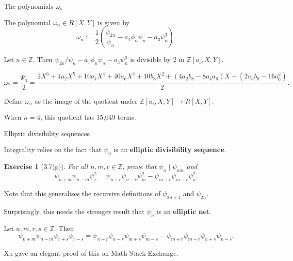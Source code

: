 \documentclass[10pt]{beamer}
\newtheorem{exercise}{Exercise}
\begin{document}
\begin{frame}[t]{The polynomials $ \omega_n $}

The polynomial $ \omega_n \in R[X, Y] $ is given by
$$ \omega_n := \dfrac{1}{2}\left(\dfrac{\psi_{2n}}{\psi_n} - a_1\phi_n\psi_n - a_3\psi_n^3\right). $$

\pause

\begin{lemma}[Xu]
Let $ n \in \mathbb{Z} $. Then $ \psi_{2n} / \psi_n - a_1\phi_n\psi_n - a_3\psi_n^3 $ is divisible by $ 2 $ in $ \mathbb{Z}[a_i, X, Y] $.
\end{lemma}

\pause

\begin{example}[$ a_1 = a_3 = 0 $]
\vspace{-0.5cm}
$$ \omega_2 = \dfrac{\Psi_4}{2} = \dfrac{\scriptstyle 2X^6 + 4a_2X^5 + 10a_4X^4 + 40a_6X^3 + 10b_8X^2 + (4a_2b_8 - 8a_4a_6)X + (2a_4b_8 - 16a_6^2)}{2}. $$
\end{example}

\pause

\vspace{0.5cm} Define $ \omega_n $ as the image of the quotient under $ \mathbb{Z}[a_i, X, Y] \to R[X, Y] $.

\pause

\vspace{0.5cm} When $ n = 4 $, this quotient has 15,049 terms.

\end{frame}

\begin{frame}[t]{Elliptic divisibility sequences}

Integrality relies on the fact that $ \psi_n $ is an \textbf{elliptic divisibility sequence}.

\begin{exercise}[3.7(g)]
For all $ n, m, r \in \mathbb{Z} $, prove that $ \psi_n \mid \psi_{nm} $ and
$$ \psi_{n + m}\psi_{n - m}\psi_r^2 = \psi_{n + r}\psi_{n - r}\psi_m^2 - \psi_{m + r}\psi_{m - r}\psi_n^2. $$
\end{exercise}

Note that this generalises the recursive definitions of $ \psi_{2n + 1} $ and $ \psi_{2n} $.

\pause

\vspace{0.5cm} Surprisingly, this needs the stronger result that $ \psi_n $ is an \textbf{elliptic net}.

\begin{theorem}[Xu]
Let $ n, m, r, s \in \mathbb{Z} $. Then
$$ \psi_{n + m}\psi_{n - m}\psi_{r + s}\psi_{r - s} = \psi_{n + r}\psi_{n - r}\psi_{m + s}\psi_{m - s} - \psi_{m + r}\psi_{m - r}\psi_{n + s}\psi_{n - s}. $$
\end{theorem}

\pause

Xu gave an elegant proof of this on Math Stack Exchange.

\end{frame}
\end{document}
